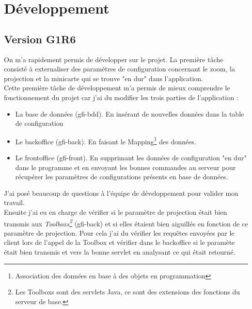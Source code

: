 \section{Développement}
\subsection{Version G1R6}
On m'a rapidement permis de développer sur le projet. La première tâche consisté à externaliser des paramètres de configuration concernant le zoom, la projection et la minicarte qui se trouve "en dur" dans l'application.
\\Cette première tâche de développement m'a permis de mieux comprendre le fonctionnement du projet car j'ai du modifier les trois parties de l'application :\\
\begin{itemize}
\item La base de données (gfi-bdd). En insérant de nouvelles données dans la table de configuration
\item Le backoffice (gfi-back). En faisant le Mapping\footnote{Association des données en base à des objets en programmation} des données.
\item Le frontoffice (gfi-front). En supprimant les données de configuration "en dur" dans le programme et en envoyant les bonnes commandes au serveur pour récupérer les paramètres de configurations présents en base de données.\\
\end{itemize}
J'ai posé beaucoup de questions à l'équipe de développement pour valider mon travail.
\\ Ensuite j'ai eu en charge de vérifier si le paramètre de projection était bien transmis aux  \textit{Toolboxs\footnote{Les Toolboxs sont des servlets Java, ce sont des extensions des fonctions du serveur de base.}} (gfi-back) et si elles étaient bien aiguillés en fonction de ce paramètre de projection.
Pour cela j'ai du vérifier les requêtes envoyées par le client lors de l'appel de la Toolbox et vérifier dans le backoffice si le paramète était bien transmis et vers la bonne servlet en analysant ce qui était retourné.

